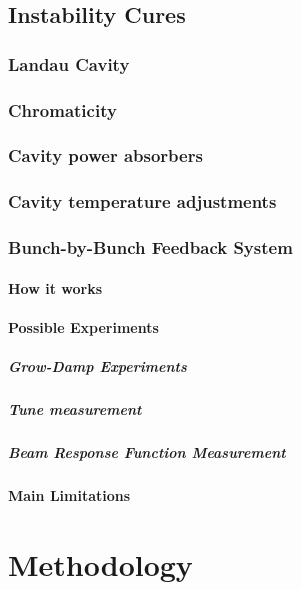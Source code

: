 \documentclass[
	12pt,				%
	openright,			%
	oneside,			%
	a4paper,		%
	chapter=TITLE,		%
	section=TITLE,		%
    brazil,				%
	english,			%
	sumario=tradicional,
	]{abntex2}
\begin{document}
  \section{Instability Cures}
    \subsection{Landau Cavity}
    \subsection{Chromaticity}
    \subsection{Cavity power absorbers}
    \subsection{Cavity temperature adjustments}
    \subsection{Bunch-by-Bunch Feedback System}
      \subsubsection{How it works}
      \subsubsection{Possible Experiments}
        \paragraph{Grow-Damp Experiments}
        \paragraph{Tune measurement}
        \paragraph{Beam Response Function Measurement}
      \subsubsection{Main Limitations}

\chapter{Methodology}
\end{document}
